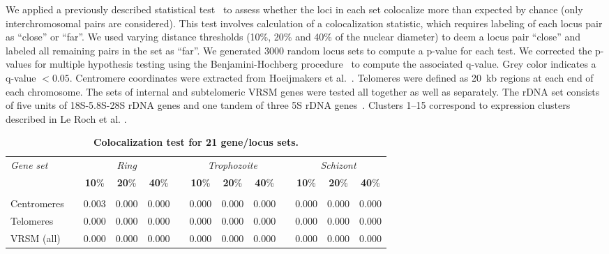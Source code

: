 \documentclass{article}
\newcommand{\gr}{\cellcolor[gray]{0.9}}
\begin{document}
\begin{table}
\caption{{\bf Colocalization test for 21 gene/locus sets.}}
{We applied a previously described statistical test~\cite{witten:assessment}
to assess whether the loci in each set colocalize more than expected by
chance (only interchromosomal pairs are considered). This test involves
calculation of a colocalization statistic, which requires labeling of each
locus pair as ``close'' or ``far''. We used varying distance thresholds
(10\%, 20\% and 40\% of the nuclear diameter) to deem a locus pair ``close''
and labeled all remaining pairs in the set as ``far''.
We generated 3000 random locus sets to compute a p-value for each test.
We corrected the p-values for multiple hypothesis testing %
using the Benjamini-Hochberg procedure~\cite{benjamini:controlling} to compute
the associated q-value. Grey color indicates a q-value $<0.05$.
Centromere coordinates were extracted from Hoeijmakers et al.~\cite{hoeijmakers:plasmodium}.
Telomeres were defined as 20~kb regions at each end of each chromosome.
The sets of internal and subtelomeric VRSM genes were tested all together
as well as separately.
The rDNA set consists of five units of 18S-5.8S-28S rDNA genes and one tandem of three 5S rDNA genes~\cite{mancio-silva:clustering}.
Clusters 1--15 correspond to expression clusters described in Le Roch et al. \cite{leroch:discovery}.
}
\vspace{10pt}
\begin{center}
\begin{tabular}{lcccccccccccc}
\hline
\multirow{2}{*}{\emph{Gene set}} & & \multicolumn{3}{c}{\emph{Ring}} & & \multicolumn{3}{c}{\emph{Trophozoite}} & &\multicolumn{3}{c}{\emph{Schizont}} \\
 & & \textbf{10}\% & \textbf{20}\% & \multicolumn{1}{c}{\textbf{40}\%} & & \textbf{10}\% & \textbf{20}\% & \multicolumn{1}{c}{\textbf{40}\%}& &\textbf{10}\% & \textbf{20}\% & \multicolumn{1}{c}{\textbf{40}\%}\\ \hline
& & & & & & & & & & & & \\
Centromeres & & \gr 0.003 & \gr 0.000 & \gr 0.000 & & \gr 0.000 & \gr 0.000 & \gr 0.000 & & \gr 0.000 & \gr 0.000 & \gr 0.000 \\
Telomeres & & \gr 0.000 & \gr 0.000 & \gr 0.000 & & \gr 0.000 & \gr 0.000 & \gr 0.000 & & \gr 0.000 & \gr 0.000 & \gr 0.000 \\
VRSM (all) & & \gr 0.000 & \gr 0.000 & \gr 0.000 & & \gr 0.000 & \gr 0.000 & \gr 0.000 & & \gr 0.000 & \gr 0.000 & \gr 0.000 \\

\end{tabular}
\end{center}
\end{table}
\end{document}
